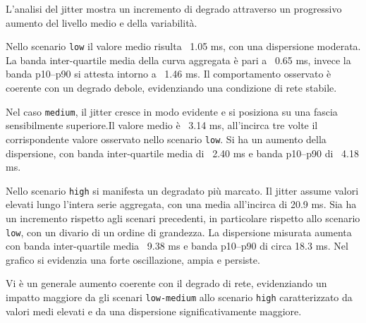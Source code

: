 L'analisi del jitter mostra un incremento di degrado attraverso un progressivo
aumento del livello medio e della variabilità.

Nello scenario \texttt{low} il valore medio risulta ~1.05 ms, con una dispersione
moderata. La banda inter-quartile media della curva aggregata è pari a ~0.65 ms,
invece la banda p10--p90 si attesta intorno a ~1.46 ms. Il comportamento osservato
è coerente con un degrado debole, evidenziando una condizione di rete stabile.

Nel caso \texttt{medium}, il jitter cresce in modo evidente e si posiziona su
una fascia sensibilmente superiore.Il valore medio è ~3.14 ms, all'incirca tre
volte il corrispondente valore osservato nello scenario \texttt{low}. Si ha un
aumento della dispersione, con banda inter-quartile media di ~2.40 ms e banda p10--p90
di ~4.18 ms.

Nello scenario \texttt{high} si manifesta un degradato più marcato. Il jitter
assume valori elevati lungo l'intera serie aggregata, con una media all'incirca di
20.9 ms. Sia ha un incremento rispetto agli scenari precedenti, in particolare rispetto
allo scenario \texttt{low}, con un divario di un ordine di grandezza. La
dispersione misurata aumenta con banda inter-quartile media ~9.38 ms e banda p10--p90
di circa 18.3 ms. Nel grafico si evidenzia una forte oscillazione, ampia e
persiste.

Vi è un generale aumento coerente con il degrado di rete, evidenziando un impatto
maggiore da gli scenari \texttt{low-medium} allo scenario \texttt{high} caratterizzato
da valori medi elevati e da una dispersione significativamente maggiore.

